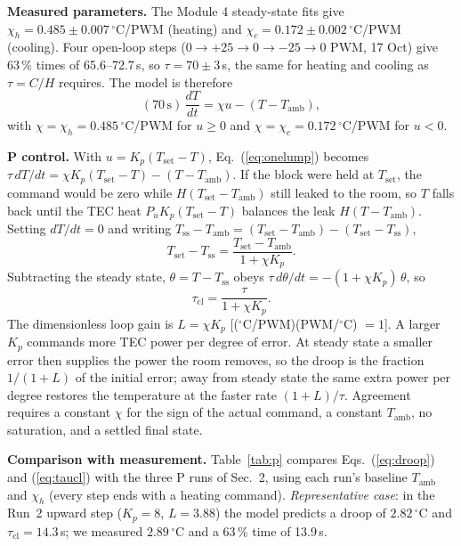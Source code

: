 \documentclass[reprint, amsmath, amssymb, aps, floatfix]{revtex4-2}
\newcommand{\degC}{\,^\circ\mathrm{C}}
\newcommand{\Tset}{T_{\mathrm{set}}}
\newcommand{\Tamb}{T_{\mathrm{amb}}}
\newcommand{\Tss}{T_{\mathrm{ss}}}
\begin{document}
\textbf{Measured parameters.} The Module 4 steady-state fits give
$\chi_h = 0.485 \pm 0.007\degC$/PWM (heating) and $\chi_c = 0.172 \pm 0.002\degC$/PWM
(cooling). Four open-loop steps ($0 \to +25 \to 0 \to -25 \to 0$ PWM, 17 Oct) give 63\,\%
times of 65.6--72.7\,s, so $\tau = 70 \pm 3$\,s, the same for heating and cooling as
$\tau = C/H$ requires. The model is therefore
\begin{equation}
(70\,\mathrm{s})\,\frac{dT}{dt} = \chi u - (T - \Tamb),
\end{equation}
with $\chi = \chi_h = 0.485\degC$/PWM for $u \ge 0$ and $\chi = \chi_c = 0.172\degC$/PWM for
$u < 0$.

\textbf{P control.} With $u = K_p(\Tset - T)$, Eq.~(\ref{eq:onelump}) becomes
$\tau\,dT/dt = \chi K_p(\Tset - T) - (T - \Tamb)$. If the block were held at $\Tset$, the
command would be zero while $H(\Tset - \Tamb)$ still leaked to the room, so $T$ falls back
until the TEC heat $P_uK_p(\Tset - T)$ balances the leak $H(T - \Tamb)$. Setting
$dT/dt = 0$ and writing $\Tss - \Tamb = (\Tset - \Tamb) - (\Tset - \Tss)$,
\begin{equation}
\Tset - \Tss = \frac{\Tset - \Tamb}{1 + \chi K_p}.
\label{eq:droop}
\end{equation}
Subtracting the steady state, $\theta = T - \Tss$ obeys
$\tau\,d\theta/dt = -(1 + \chi K_p)\,\theta$, so
\begin{equation}
\tau_{\mathrm{cl}} = \frac{\tau}{1 + \chi K_p}.
\label{eq:taucl}
\end{equation}
The dimensionless loop gain is $L = \chi K_p$ [($^\circ$C/PWM)(PWM/$^\circ$C) $= 1$].
A larger $K_p$ commands more TEC power per degree of error. At steady state a smaller error
then supplies the power the room removes, so the droop is the fraction $1/(1+L)$ of the
initial error; away from steady state the same extra power per degree restores the
temperature at the faster rate $(1+L)/\tau$. Agreement requires a constant $\chi$ for the
sign of the actual command, a constant $\Tamb$, no saturation, and a settled final state.

\textbf{Comparison with measurement.} Table~\ref{tab:p} compares Eqs.~(\ref{eq:droop}) and
(\ref{eq:taucl}) with the three P runs of Sec.~2, using each run's baseline $\Tamb$ and
$\chi_h$ (every step ends with a heating command). \emph{Representative case}: in the
Run~2 upward step ($K_p = 8$, $L = 3.88$) the model predicts a droop of $2.82\degC$ and
$\tau_{\mathrm{cl}} = 14.3$\,s; we measured $2.89\degC$ and a 63\,\% time of 13.9\,s.
\end{document}
